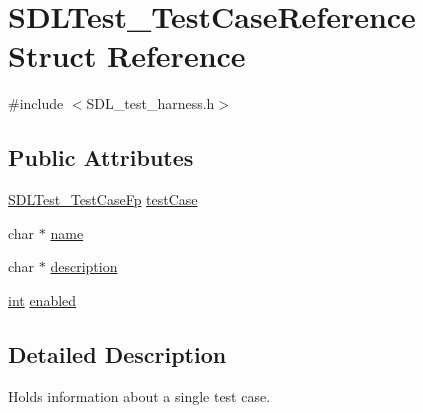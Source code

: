 \hypertarget{struct_s_d_l_test___test_case_reference}{\section{S\-D\-L\-Test\-\_\-\-Test\-Case\-Reference Struct Reference}
\label{struct_s_d_l_test___test_case_reference}
}


{\ttfamily \#include $<$S\-D\-L\-\_\-test\-\_\-harness.\-h$>$}

\subsection*{Public Attributes}
\begin{DoxyCompactItemize}
\item 
\hyperlink{_s_d_l__test__harness_8h_a999ef3d353a817ab1c127f3c607d8c7d}{S\-D\-L\-Test\-\_\-\-Test\-Case\-Fp} \hyperlink{struct_s_d_l_test___test_case_reference_af9472f0c421a2845b540fc28fb30a3ef}{test\-Case}
\item 
char $\ast$ \hyperlink{struct_s_d_l_test___test_case_reference_aabd588c915c52fb13bcd0c71e071a604}{name}
\item 
char $\ast$ \hyperlink{struct_s_d_l_test___test_case_reference_a1ee6c8a2529fdfcd62bb1483c26be67d}{description}
\item 
\hyperlink{_s_d_l__thread_8h_a6a64f9be4433e4de6e2f2f548cf3c08e}{int} \hyperlink{struct_s_d_l_test___test_case_reference_a15168c85e38cae7557b4beb477ef6f9a}{enabled}
\end{DoxyCompactItemize}


\subsection{Detailed Description}
Holds information about a single test case. 

